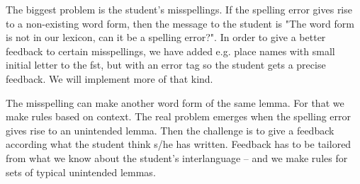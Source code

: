 \documentclass[11pt]{article}
\begin{document}
%

The biggest problem is the student's misspellings. If the spelling error gives rise to a non-existing word form, then the message to the student is "The word form is not in our lexicon, can it be a spelling error?". In order to give a better feedback to certain misspellings, we have added e.g. place names with small initial letter to the fst, but with an error tag so the student gets a precise feedback. We will implement more of that kind.

The misspelling can make another word form of the same lemma. For that we make rules based on context. The real problem emerges when the spelling error gives rise to an unintended lemma. Then the challenge is to give a feedback according what the student think s/he has written. Feedback has to be tailored from what we know about the student’s interlanguage – and we make rules for sets of typical unintended lemmas.
\end{document}
